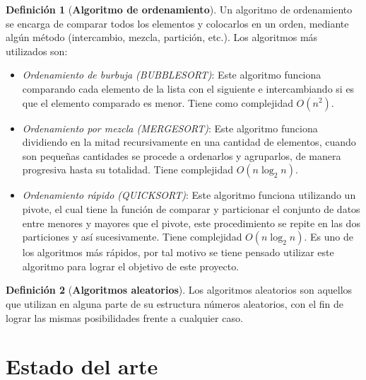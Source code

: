 \documentclass[final,a4paper,romanappendices]{IEEEtran}\usepackage[]{graphicx}\usepackage[]{color}
\theoremstyle{definition}
\newtheorem{definition}{Definición}[subsection]
\begin{document}
\begin{definition}[\bf {Algoritmo de ordenamiento}]

Un algoritmo de ordenamiento se encarga de comparar todos los elementos y colocarlos en un orden, mediante algún método (intercambio, mezcla, partición, etc.). Los algoritmos más utilizados son: %
\begin{itemize}
	
	\item \textit{Ordenamiento de burbuja (BUBBLESORT)}:	Este algoritmo funciona comparando cada elemento de la lista con el siguiente e intercambiando si es que el elemento comparado es menor. Tiene como complejidad $O(n^2)$.

	\item \textit{Ordenamiento por mezcla (MERGESORT)}:	Este algoritmo funciona dividiendo en la mitad recursivamente en una cantidad de elementos, cuando son pequeñas cantidades se procede a ordenarlos y agruparlos, de manera progresiva hasta su totalidad. Tiene complejidad $O(n\log_{2} n)$.
	
	\item \textit{Ordenamiento rápido (QUICKSORT)}:	Este algoritmo funciona utilizando un pivote, el cual tiene la función de comparar y particionar el conjunto de datos entre menores y mayores que el pivote, este procedimiento se repite en las dos particiones y así sucesivamente. Tiene complejidad $O(n\log_{2} n)$. Es uno de los algoritmos más rápidos, por tal motivo se tiene pensado utilizar este algoritmo para lograr el objetivo de este proyecto.
	
\end{itemize}

\end{definition}

\begin{definition}[\bf {Algoritmos aleatorios}]
Los algoritmos aleatorios son aquellos que utilizan en alguna parte de su estructura números aleatorios, con el fin de lograr las mismas posibilidades frente a cualquier caso.
\end{definition}

\section{Estado del arte}
\end{document}
